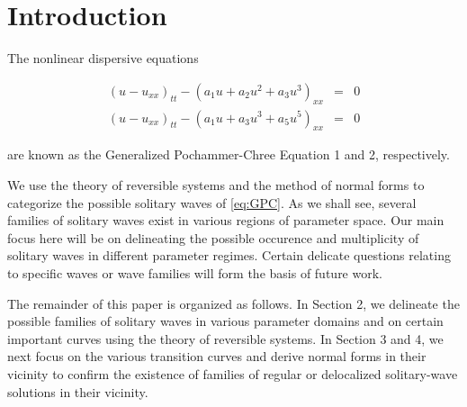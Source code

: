 \section{Introduction}

The nonlinear dispersive equations \cite{Roy1}

\begin{subequations}\label{eq:GPC}
\begin{eqnarray}
\left( u - u_{xx} \right)_{tt} - \left( a_1 u + a_2 u^2 + a_3 u^3 \right)_{xx} &=&0 \label{eq:GPC1} \\
\left( u - u_{xx} \right)_{tt} - \left( a_1 u + a_3 u^3 + a_5 u^5 \right)_{xx} &=&0 \label{eq:GPC2} 
\end{eqnarray}
\end{subequations}

are known as the Generalized Pochammer-Chree Equation 1 and 2, respectively.

We use the theory of reversible systems and the method of normal forms to categorize the possible solitary waves of \eqref{eq:GPC}.
As we shall see, several families of solitary waves exist in various regions of parameter space. Our main focus here will be on 
delineating the possible occurence and multiplicity of solitary waves in different parameter regimes. Certain delicate questions
relating to specific waves or wave families will form the basis of future work. 

The remainder of this paper is organized as follows. In Section 2, we delineate the possible families of solitary waves
in various parameter domains and on certain important curves using the theory of reversible systems. In Section 3 and 4, we next
focus on the various transition curves and derive normal forms in their vicinity to confirm the existence of families of 
regular or delocalized solitary-wave solutions in their vicinity.
